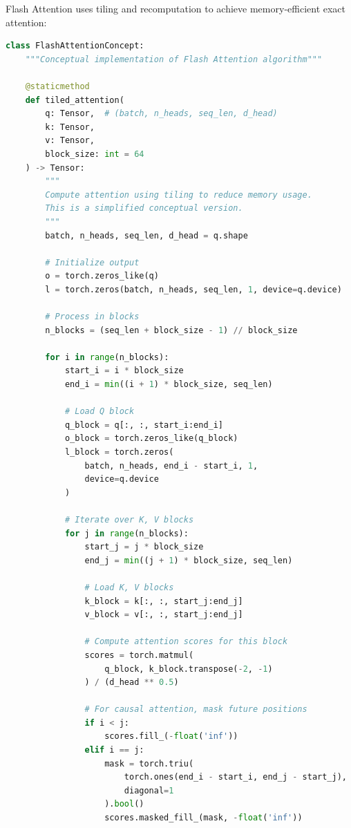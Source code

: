 Flash Attention uses tiling and recomputation to achieve memory-efficient exact attention:

\begin{lstlisting}[language=Python, caption=Flash Attention Concept]
class FlashAttentionConcept:
    """Conceptual implementation of Flash Attention algorithm"""

    @staticmethod
    def tiled_attention(
        q: Tensor,  # (batch, n_heads, seq_len, d_head)
        k: Tensor,
        v: Tensor,
        block_size: int = 64
    ) -> Tensor:
        """
        Compute attention using tiling to reduce memory usage.
        This is a simplified conceptual version.
        """
        batch, n_heads, seq_len, d_head = q.shape

        # Initialize output
        o = torch.zeros_like(q)
        l = torch.zeros(batch, n_heads, seq_len, 1, device=q.device)

        # Process in blocks
        n_blocks = (seq_len + block_size - 1) // block_size

        for i in range(n_blocks):
            start_i = i * block_size
            end_i = min((i + 1) * block_size, seq_len)

            # Load Q block
            q_block = q[:, :, start_i:end_i]
            o_block = torch.zeros_like(q_block)
            l_block = torch.zeros(
                batch, n_heads, end_i - start_i, 1,
                device=q.device
            )

            # Iterate over K, V blocks
            for j in range(n_blocks):
                start_j = j * block_size
                end_j = min((j + 1) * block_size, seq_len)

                # Load K, V blocks
                k_block = k[:, :, start_j:end_j]
                v_block = v[:, :, start_j:end_j]

                # Compute attention scores for this block
                scores = torch.matmul(
                    q_block, k_block.transpose(-2, -1)
                ) / (d_head ** 0.5)

                # For causal attention, mask future positions
                if i < j:
                    scores.fill_(-float('inf'))
                elif i == j:
                    mask = torch.triu(
                        torch.ones(end_i - start_i, end_j - start_j),
                        diagonal=1
                    ).bool()
                    scores.masked_fill_(mask, -float('inf'))


\end{lstlisting}
